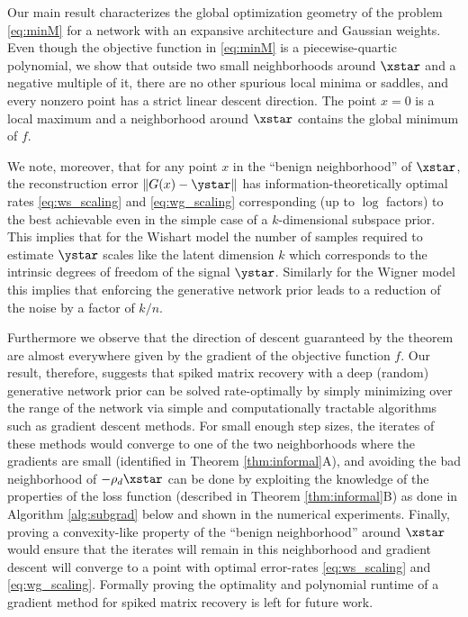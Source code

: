 Our main result characterizes the global optimization geometry of the problem \eqref{eq:minM} for a network with an expansive architecture and Gaussian weights. 
Even though the objective function in \eqref{eq:minM} is a piecewise-quartic polynomial, we show that outside two small neighborhoods around $\xstar$ and a negative multiple of it, there are no other spurious local minima or saddles, and every nonzero point has a strict linear descent direction. The point $x = 0$ is a local maximum and a neighborhood around $\xstar$ contains the global minimum of $f$.

We note, moreover, that for any point $x$ in the ``benign neighborhood'' of $\xstar$, the reconstruction error $\| G(x) - \ystar \|$ has information-theoretically optimal rates \eqref{eq:ws_scaling} and \eqref{eq:wg_scaling} corresponding (up to $\log$ factors) to the best achievable even in the simple case of a $k$-dimensional subspace prior. This implies that for the Wishart model the number of samples required to estimate $\ystar$ scales like the latent dimension $k$ which corresponds to the intrinsic degrees of freedom of the signal $\ystar$. Similarly for the Wigner model this implies that enforcing the generative network prior leads to a reduction of the noise by a factor of ${k}/{n}$. 


Furthermore we observe that the direction of descent guaranteed by the theorem are almost everywhere given by the gradient of the objective function $f$. Our result, therefore, suggests 
that spiked matrix recovery
with a deep (random) generative network prior can be solved rate-optimally by simply minimizing over the range of the network via simple and computationally tractable algorithms such as gradient descent methods. For small enough step sizes, the iterates of these methods would converge to  one of the two neighborhoods where the gradients are small (identified in Theorem \ref{thm:informal}A), and avoiding the bad neighborhood of $- \rho_d \xstar$ can be done by exploiting the knowledge of the properties of the loss function (described in Theorem \ref{thm:informal}B) as done in Algorithm \ref{alg:subgrad} below and shown in the numerical experiments.
Finally, proving a convexity-like property of the ``benign neighborhood'' around $\xstar$ would ensure that the iterates will remain in this neighborhood and gradient descent will converge to a point with optimal error-rates \eqref{eq:ws_scaling} and \eqref{eq:wg_scaling}.
Formally proving the optimality and polynomial runtime of a gradient method for spiked matrix recovery is left for future work. 



